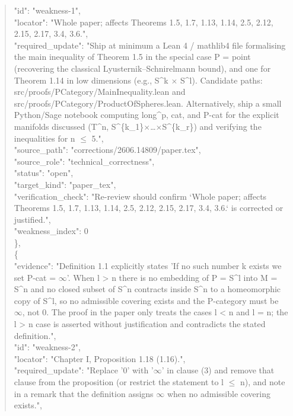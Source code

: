 \documentclass[11pt]{article}
\begin{document}
\begin{quote}
      "id": "weakness-1",\\
      "locator": "Whole paper; affects Theorems 1.5, 1.7, 1.13, 1.14, 2.5, 2.12, 2.15, 2.17, 3.4, 3.6.",\\
      "required\_update": "Ship at minimum a Lean 4 / mathlib4 file formalising the main inequality of Theorem 1.5 in the special case P = point (recovering the classical Lyusternik--Schnirelmann bound), and one for Theorem 1.14 in low dimensions (e.g., S\^{}k \ensuremath{\times} S\^{}l). Candidate paths: src/proofs/PCategory/MainInequality.lean and src/proofs/PCategory/ProductOfSpheres.lean. Alternatively, ship a small Python/Sage notebook computing long\^{}p, cat, and P-cat for the explicit manifolds discussed (T\^{}n, S\^{}\{k\_1\}\ensuremath{\times}…\ensuremath{\times}S\^{}\{k\_r\}) and verifying the inequalities for n \ensuremath{\le} 5.",\\
      "source\_path": "corrections/2606.14809/paper.tex",\\
      "source\_role": "technical\_correctness",\\
      "status": "open",\\
      "target\_kind": "paper\_tex",\\
      "verification\_check": "Re-review should confirm `Whole paper; affects Theorems 1.5, 1.7, 1.13, 1.14, 2.5, 2.12, 2.15, 2.17, 3.4, 3.6.` is corrected or justified.",\\
      "weakness\_index": 0\\
    \},\\
    \{\\
      "evidence": "Definition 1.1 explicitly states 'If no such number k exists we set P-cat = \ensuremath{\infty}'. When l > n there is no embedding of P = S\^{}l into M = S\^{}n and no closed subset of S\^{}n contracts inside S\^{}n to a homeomorphic copy of S\^{}l, so no admissible covering exists and the P-category must be \ensuremath{\infty}, not 0. The proof in the paper only treats the cases l < n and l = n; the l > n case is asserted without justification and contradicts the stated definition.",\\
      "id": "weakness-2",\\
      "locator": "Chapter I, Proposition 1.18 (1.16).",\\
      "required\_update": "Replace '0' with '\ensuremath{\infty}' in clause (3) and remove that clause from the proposition (or restrict the statement to l \ensuremath{\le} n), and note in a remark that the definition assigns \ensuremath{\infty} when no admissible covering exists.",\\

\end{quote}
\end{document}
